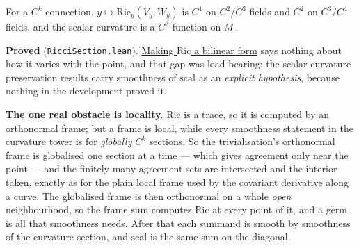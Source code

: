 \begin{lemma}
  \label{lem:ricci-section}
  \leanok
  For a $C^k$ connection, $y \mapsto \mathrm{Ric}_y(V_y, W_y)$ is $C^1$ on $C^2/C^3$ fields
  and $C^2$ on $C^3/C^4$ fields, and the scalar curvature is a $C^2$ function on $M$.

  \textbf{Proved} (\texttt{RicciSection.lean}). \hyperref[def:ricci-form]{Making
  $\mathrm{Ric}$ a bilinear form} says nothing about how it varies with the point, and that
  gap was load-bearing: the scalar-curvature preservation results carry smoothness of
  $\mathrm{scal}$ as an \emph{explicit hypothesis}, because nothing in the development proved
  it.

  \textbf{The one real obstacle is locality.} $\mathrm{Ric}$ is a trace, so it is computed by
  an orthonormal frame; but a frame is local, while every smoothness statement in the
  curvature tower is for \emph{globally} $C^k$ sections. So the trivialisation's orthonormal
  frame is globalised one section at a time --- which gives agreement only near the point ---
  and the finitely many agreement sets are intersected and the interior taken, exactly as for
  the plain local frame used by the covariant derivative along a curve. The globalised frame
  is then orthonormal on a whole \emph{open} neighbourhood, so the frame sum computes
  $\mathrm{Ric}$ at every point of it, and a germ is all that smoothness needs. After that
  each summand is smooth by smoothness of the curvature section, and $\mathrm{scal}$ is the
  same sum on the diagonal.
\end{lemma}

